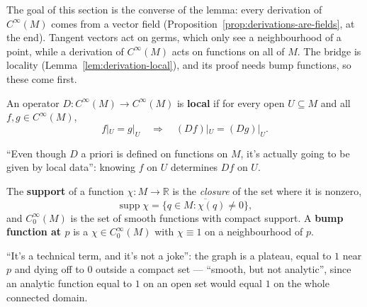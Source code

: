 \documentclass[11pt]{report}
\makeatletter
\newcounter{defcounter}[section]
\newcommand{\deflabel}[1]{\edef\@currentlabel{\arabic{section}.\arabic{defcounter}}\label{#1}}
\newcommand{\leeref}[1]{\par\smallskip{\raggedleft\footnotesize\textsc{Lee}:\ #1\par}}
\makeatother
\begin{document}
The goal of this section is the converse of the lemma: every derivation of $C^\infty(M)$ comes from a vector field (Proposition~\ref{prop:derivations-are-fields}, at the end). Tangent vectors act on germs, which only see a neighbourhood of a point, while a derivation of $C^\infty(M)$ acts on functions on all of $M$. The bridge is locality (Lemma~\ref{lem:derivation-local}), and its proof needs bump functions, so these come first.

\begin{defbox}\deflabel{def:local-operator}
An operator $D : C^\infty(M) \to C^\infty(M)$ is \textbf{local} if for every open $U \subseteq M$ and all $f, g \in C^\infty(M)$,
\[
f|_U = g|_U \quad \Longrightarrow \quad (Df)|_U = (Dg)|_U .
\]
\end{defbox}

``Even though $D$ a priori is defined on functions on $M$, it's actually going to be given by local data'': knowing $f$ on $U$ determines $Df$ on $U$.

\begin{defbox}\deflabel{def:bump-function}
The \textbf{support} of a function $\chi : M \to \mathbb{R}$ is the \emph{closure} of the set where it is nonzero,
\[
\operatorname{supp}\chi = \overline{\{ q \in M : \chi(q) \neq 0 \}} ,
\]
and $C^\infty_0(M)$ is the set of smooth functions with compact support. A \textbf{bump function at $p$} is a $\chi \in C^\infty_0(M)$ with $\chi \equiv 1$ on a neighbourhood of $p$.
\leeref{Ch.~2, \emph{Partitions of Unity}}
\end{defbox}

``It's a technical term, and it's not a joke'': the graph is a plateau, equal to $1$ near $p$ and dying off to $0$ outside a compact set --- ``smooth, but not analytic'', since an analytic function equal to $1$ on an open set would equal $1$ on the whole connected domain.
\end{document}
